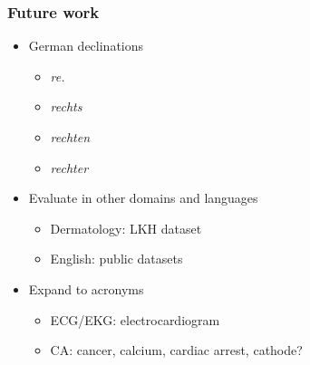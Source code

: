 \begin{frame}
	\frametitle{Future work}
	\begin{itemize} \myspacing
		\item German declinations
		\begin{itemize}
			\item \emph{re.}
			\item \emph{rechts}
			\item \emph{rechten}
			\item \emph{rechter}
		\end{itemize}
		\item Evaluate in other domains and languages
		\begin{itemize}
			\item Dermatology: LKH dataset
			\item English: public datasets
		\end{itemize}
		\item Expand to acronyms
		\begin{itemize}
			\item ECG/EKG: electrocardiogram
			\item CA: cancer, calcium, cardiac arrest, cathode?
		\end{itemize}
	\end{itemize}
\end{frame}


